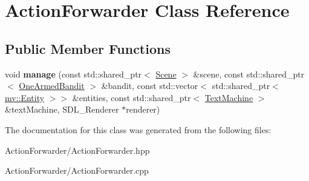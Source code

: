 \hypertarget{class_action_forwarder}{}\section{Action\+Forwarder Class Reference}
\label{class_action_forwarder}
\subsection*{Public Member Functions}
\begin{DoxyCompactItemize}
\item 
\mbox{\label{class_action_forwarder_a8443feb3831a8902ae1ad3e97d43ee6d}} 
void {\bfseries manage} (const std\+::shared\+\_\+ptr$<$ \mbox{\hyperlink{class_scene}{Scene}} $>$ \&scene, const std\+::shared\+\_\+ptr$<$ \mbox{\hyperlink{class_one_armed_bandit}{One\+Armed\+Bandit}} $>$ \&bandit, const std\+::vector$<$ std\+::shared\+\_\+ptr$<$ \mbox{\hyperlink{classmv_1_1_entity}{mv\+::\+Entity}} $>$$>$ \&entities, const std\+::shared\+\_\+ptr$<$ \mbox{\hyperlink{class_text_machine}{Text\+Machine}} $>$ \&text\+Machine, S\+D\+L\+\_\+\+Renderer $\ast$renderer)
\end{DoxyCompactItemize}


The documentation for this class was generated from the following files\+:\begin{DoxyCompactItemize}
\item 
Action\+Forwarder/Action\+Forwarder.\+hpp\item 
Action\+Forwarder/Action\+Forwarder.\+cpp\end{DoxyCompactItemize}
